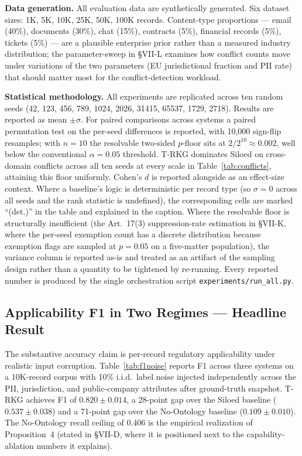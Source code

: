 \documentclass{ieeeaccess}
\begin{document}
\textbf{Data generation.} All evaluation data are synthetically generated. Six dataset sizes: 1K, 5K, 10K, 25K, 50K, 100K records. Content-type proportions — email (40\%), documents (30\%), chat (15\%), contracts (5\%), financial records (5\%), tickets (5\%) — are a plausible enterprise prior rather than a measured industry distribution; the parameter-sweep in §VII-L examines how conflict counts move under variations of the two parameters (EU jurisdictional fraction and PII rate) that should matter most for the conflict-detection workload.

\textbf{Statistical methodology.} All experiments are replicated across ten random seeds (42, 123, 456, 789, 1024, 2026, 31415, 65537, 1729, 2718). Results are reported as mean $\pm \sigma$. For paired comparisons across systems a paired permutation test on the per-seed differences is reported, with 10{,}000 sign-flip resamples; with $n{=}10$ the resolvable two-sided $p$-floor sits at $2/2^{10} \approx 0.002$, well below the conventional $\alpha=0.05$ threshold. T-RKG dominates Siloed on cross-domain conflicts across all ten seeds at every scale in Table~\ref{tab:conflicts}, attaining this floor uniformly. Cohen's $d$ is reported alongside as an effect-size context. Where a baseline's logic is deterministic per record type (so $\sigma=0$ across all seeds and the rank statistic is undefined), the corresponding cells are marked ``(det.)'' in the table and explained in the caption. Where the resolvable floor is structurally insufficient (the Art.~17(3) suppression-rate estimation in §VII-K, where the per-seed exemption count has a discrete distribution because exemption flags are sampled at $p{=}0.05$ on a five-matter population), the variance column is reported as-is and treated as an artifact of the sampling design rather than a quantity to be tightened by re-running. Every reported number is produced by the single orchestration script \texttt{experiments/run\_all.py}.

\subsection{Applicability F1 in Two Regimes --- Headline Result}
\label{sec:f1}

The substantive accuracy claim is per-record regulatory applicability under realistic input corruption. Table~\ref{tab:f1noise} reports F1 across three systems on a 10K-record corpus with 10\% i.i.d.\ label noise injected independently across the PII, jurisdiction, and public-company attributes after ground-truth snapshot. T-RKG achieves F1 of $0.820 \pm 0.014$, a 28-point gap over the Siloed baseline ($0.537 \pm 0.038$) and a 71-point gap over the No-Ontology baseline ($0.109 \pm 0.010$). The No-Ontology recall ceiling of 0.406 is the empirical realization of Proposition~4 (stated in §VII-D, where it is positioned next to the capability-ablation numbers it explains).
\end{document}
